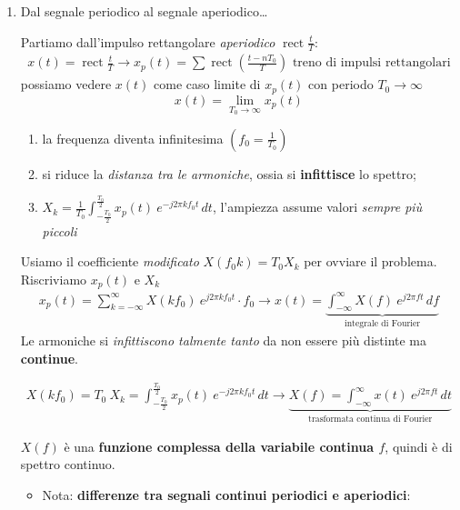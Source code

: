 \documentclass[
]{article}
\providecommand{\tightlist}{%
  \setlength{\itemsep}{0pt}\setlength{\parskip}{0pt}}
\begin{document}
\begin{enumerate}
\def\labelenumi{\arabic{enumi}.}
\setcounter{enumi}{8}
\item
  Dal segnale periodico al segnale aperiodico\ldots{}

  Partiamo dall'impulso rettangolare \emph{aperiodico}
  \(\mathop{\mathrm{rect}}{\frac{t}{T}}\): \begin{gather*}
   x(t) = \mathop{\mathrm{rect}}{\frac{t}{T}} \to x_{p}(t) = \sum \mathop{\mathrm{rect}}(\frac{t-nT_0}{T}) \text{ treno di impulsi rettangolari}
   \end{gather*} possiamo vedere \(x(t)\) come caso limite di \(x_p(t)\)
  con periodo \(T_0 \to \infty\) \[
   x(t) = \lim_{T_0 \to \infty} x_{p}(t)
   \]

  \begin{enumerate}
  \def\labelenumii{\arabic{enumii}.}
  \tightlist
  \item
    la frequenza diventa infinitesima \((f_0 = \frac{1}{T_0})\)
  \item
    si riduce la \emph{distanza tra le armoniche}, ossia si
    \textbf{infittisce} lo spettro;
  \item
    \(X_k=\frac{1}{T_0}\int_{-\frac{T_0}{2}}^{\frac{T_0}{2}} x_p(t) \ e^{-j2\pi kf_0 t}\,dt\),
    l'ampiezza assume valori \emph{sempre più piccoli}
  \end{enumerate}

  Usiamo il coefficiente \emph{modificato} \(X(f_0 k) = T_0 X_k\) per
  ovviare il problema. Riscriviamo \(x_p(t)\) e \(X_k\)\\
  \begin{gather*}
   x_{p}(t) = \sum_{k=-\infty}^{\infty}X(kf_0)\ e^{j2\pi kf_0 t} \cdot f_0 \to x(t) = \underbrace{\int_{-\infty}^{\infty}X(f)\ e^{j2\pi ft}\,df}_{\text{integrale di Fourier}}
   \end{gather*} Le armoniche si \emph{infittiscono talmente tanto} da
  non essere più distinte ma \textbf{continue}.

  \begin{gather*}
   X(kf_0) = T_0 \ X_k = \int_{-\frac{T_0}{2}}^{\frac{T_0}{2}}  x_{p}(t) \ e^{-j2\pi kf_0 t}\,dt \to \underbrace{X(f) = \int_{-\infty}^{\infty}x(t)\ e^{j2\pi ft}\,dt}_{\text{trasformata continua di Fourier}}
   \end{gather*}

  \(X(f)\) è una \textbf{funzione complessa della variabile continua
  \(f\)}, quindi è di spettro continuo.

  \begin{itemize}
  \tightlist
  \item
    Nota: \textbf{differenze tra segnali continui periodici e
    aperiodici}:


\end{itemize}
\end{enumerate}
\end{document}
